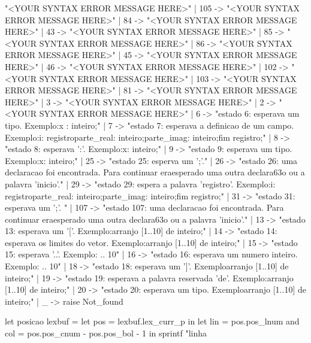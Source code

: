 \documentclass[12pt,a4paper,twoside]{article}
\begin{document}
\begin{terminal}
        "<YOUR SYNTAX ERROR MESSAGE HERE>\n"
    | 105 ->
        "<YOUR SYNTAX ERROR MESSAGE HERE>\n"
    | 84 ->
        "<YOUR SYNTAX ERROR MESSAGE HERE>\n"
    | 43 ->
        "<YOUR SYNTAX ERROR MESSAGE HERE>\n"
    | 85 ->
        "<YOUR SYNTAX ERROR MESSAGE HERE>\n"
    | 86 ->
        "<YOUR SYNTAX ERROR MESSAGE HERE>\n"
    | 45 ->
        "<YOUR SYNTAX ERROR MESSAGE HERE>\n"
    | 46 ->
        "<YOUR SYNTAX ERROR MESSAGE HERE>\n"
    | 102 ->
        "<YOUR SYNTAX ERROR MESSAGE HERE>\n"
    | 103 ->
        "<YOUR SYNTAX ERROR MESSAGE HERE>\n"
    | 81 ->
        "<YOUR SYNTAX ERROR MESSAGE HERE>\n"
    | 3 ->
        "<YOUR SYNTAX ERROR MESSAGE HERE>\n"
    | 2 ->
        "<YOUR SYNTAX ERROR MESSAGE HERE>\n"
    | 6 ->
        "estado 6: esperava um tipo. Exemplo:\n   x : inteiro;\n"
    | 7 ->
        "estado 7: esperava a definicao de um campo. Exemplo:\n   i: registro\n         parte_real: inteiro;\n         parte_imag: inteiro;\n      fim registro;\n      "
    | 8 ->
        "estado 8: esperava ':'. Exemplo:\n   x: inteiro;\n   "
    | 9 ->
        "estado 9: esperava um tipo. Exemplo:\n   x: inteiro;\n"
    | 25 ->
        "estado 25: esperva um ';'.\n"
    | 26 ->
        "estado 26: uma declaracao foi encontrada. Para continuar era\n   esperado uma outra declara\163o ou a palavra 'inicio'.\n"
    | 29 ->
        "estado 29: espera a palavra 'registro'. Exemplo:\n   i: registro\n         parte_real: inteiro;\n         parte_imag: inteiro;\n      fim registro;\n"
    | 31 ->
        "estado 31: esperava um ';'. \n"
    | 107 ->
        "estado 107: uma declaracao foi encontrada. Para continuar era\n   esperado uma outra declara\163o ou a palavra 'inicio'.\n"
    | 13 ->
        "estado 13: esperava um '['. Exemplo:\n   arranjo [1..10] de inteiro;\n"
    | 14 ->
        "estado 14: esperava os limites do vetor. Exemplo:\n   arranjo [1..10] de inteiro;\n"
    | 15 ->
        "estado 15: esperava '..'. Exemplo: .. 10\n"
    | 16 ->
        "estado 16: esperava um numero inteiro. Exemplo: .. 10\n"
    | 18 ->
        "estado 18: esperava um ']'. Exemplo\n   arranjo [1..10] de inteiro;\n"
    | 19 ->
        "estado 19: esperava a palavra reservada 'de'. Exemplo:\n   arranjo [1..10] de inteiro;\n"
    | 20 ->
        "estado 20: esperava um tipo. Exemplo\n   arranjo [1..10] de inteiro;\n"
    | _ ->
        raise Not_found

let posicao lexbuf =
    let pos = lexbuf.lex_curr_p in
    let lin = pos.pos_lnum
    and col = pos.pos_cnum - pos.pos_bol - 1 in
    sprintf "linha %


\end{terminal}
\end{document}
